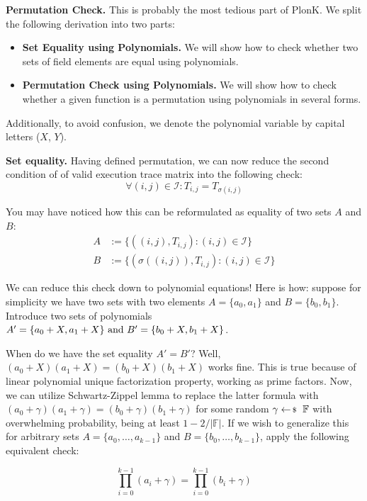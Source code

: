 \documentclass[../../book.tex]{subfiles}
\begin{document}
\textcolor{green!60!black}{\textbf{Permutation Check.}} This is probably the most
tedious part of PlonK. We split the following derivation into two parts:
\begin{itemize}
    \item \textbf{Set Equality using Polynomials.} We will show how to check
    whether two sets of field elements are equal using polynomials.
    \item \textbf{Permutation Check using Polynomials.} We will show how to
    check whether a given function is a permutation using polynomials in several 
    forms.
\end{itemize}

Additionally, to avoid confusion, we denote the polynomial variable by capital letters ($X$, $Y$).

\textbf{Set equality.} Having defined permutation, we can now reduce the second
condition of  of valid execution trace matrix into
the following check:
\[\forall (i, j) \in \mathcal{I}: T_{i,j} = T_{\sigma(i,j)}\]

You may have noticed how this can be reformulated as equality of two sets $A$ and $B$:
\begin{align*}
    A &:= \{((i, j), T_{i,j}) : (i, j) \in \mathcal{I}\} \\
    B &:= \{(\sigma((i, j)), T_{i,j}) : (i, j) \in \mathcal{I}\}
\end{align*}

We can reduce this check down to polynomial equations! Here is how: suppose for
simplicity we have two sets with two elements \(A = \{a_0, a_1\}\) and \(B =
\{b_0, b_1\}\). Introduce two sets of polynomials \(A' = \{a_0 + X, a_1 +
X\}$ and $B' = \{b_0 + X, b_1 + X\}\). 

When do we have the set equality \(A' = B'\)? Well, \((a_0 + X)(a_1 + X) = (b_0
+ X)(b_1 + X)\) works fine. This is true because of linear polynomial unique
factorization property, working as prime factors. Now, we can utilize
Schwartz-Zippel lemma to replace the latter formula with \((a_0 + \gamma)(a_1 +
\gamma) = (b_0 + \gamma)(b_1 + \gamma)\) for some random $\gamma \leftarrowS
\mathbb{F}$ with overwhelming probability, being at least $1-2/|\mathbb{F}|$. If we
wish to generalize this for arbitrary sets \(A = \{a_0, \ldots, a_{k-1}\}\) and
\(B = \{b_0, \ldots, b_{k-1}\}\), apply the following equivalent check:

\[\prod_{i=0}^{k-1} (a_i + \gamma) = \prod_{i=0}^{k-1} (b_i + \gamma)\]
\end{document}

